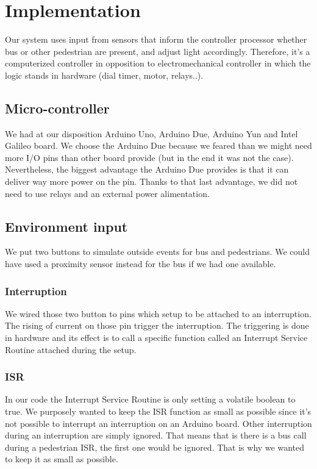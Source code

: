 \section{Implementation}

Our system uses input from sensors that inform the controller processor whether bus or other pedestrian are present, and adjust light accordingly. Therefore, it's a computerized controller in opposition to electromechanical controller in which the logic stands in hardware (dial timer, motor, relays..).

\subsection{Micro-controller}

We had at our disposition Arduino Uno, Arduino Due, Arduino Yun and Intel Galileo board. We choose the Arduino Due because we feared than we might need more I/O pins than other board provide (but in the end it was not the case).	 Nevertheless, the biggest advantage the Arduino Due provides is that it can deliver way more power on the pin. Thanks to that last advantage, we did not need to use relays and an external power alimentation.

\subsection{Environment input}

We put two buttons to simulate outside events for bus and pedestrians. We could have used a proximity sensor instead for the bus if we had one available.

\subsubsection{Interruption}

We wired those two button to pins which setup to be attached to an interruption. The rising of current on those pin trigger the interruption. The triggering is done in hardware and its effect is to call a specific function called an Interrupt Service Routine attached during the setup.

\subsubsection{ISR}

In our code the Interrupt Service Routine is only setting a volatile boolean to true. We purposely wanted to keep the ISR function as small as possible since it's not possible to interrupt an interruption on an Arduino board. Other interruption during an interruption are simply ignored. That means that is there is a bus call during a pedestrian ISR, the first one would be ignored. That is why we wanted to keep it as small as possible. 

